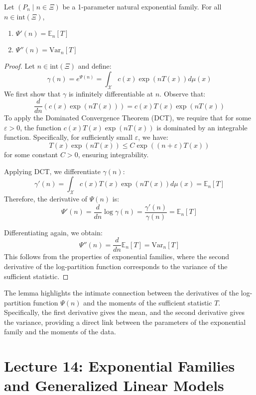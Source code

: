 \documentclass[open=any, 11pt,paper=A4]{scrreprt}
\begin{document}
\begin{lemma}
    Let \((P_n \mid n \in \Xi)\) be a 1-parameter natural exponential family. For all \(n \in \text{int}(\Xi)\),
    \begin{enumerate}
        \item \(\Psi'(n) = \mathbb{E}_n[T]\)
        \item \(\Psi''(n) = \text{Var}_n[T]\)
    \end{enumerate}
\end{lemma}

\begin{proof}
    Let \(n \in \text{int}(\Xi)\) and define:
    \[
    \gamma(n) = e^{\Psi(n)} = \int_{\mathcal{X}} c(x) \exp(n T(x)) d\mu(x)
    \]
    We first show that \(\gamma\) is infinitely differentiable at \(n\). Observe that:
    \[
    \frac{d}{dn} \left( c(x) \exp(n T(x)) \right) = c(x) T(x) \exp(n T(x))
    \]
    To apply the Dominated Convergence Theorem (DCT), we require that for some \(\varepsilon > 0\), the function \(c(x) T(x) \exp(n T(x))\) is dominated by an integrable function. Specifically, for sufficiently small \(\varepsilon\), we have:
    \[
    T(x) \exp(n T(x)) \leq C \exp((n + \varepsilon) T(x))
    \]
    for some constant \(C > 0\), ensuring integrability.

    Applying DCT, we differentiate \(\gamma(n)\):
    \[
    \gamma'(n) = \int_{\mathcal{X}} c(x) T(x) \exp(n T(x)) d\mu(x) = \mathbb{E}_n[T]
    \]
    Therefore, the derivative of \(\Psi(n)\) is:
    \[
    \Psi'(n) = \frac{d}{dn} \log \gamma(n) = \frac{\gamma'(n)}{\gamma(n)} = \mathbb{E}_n[T]
    \]

    Differentiating again, we obtain:
    \[
    \Psi''(n) = \frac{d}{dn} \mathbb{E}_n[T] = \text{Var}_n[T]
    \]
    This follows from the properties of exponential families, where the second derivative of the log-partition function corresponds to the variance of the sufficient statistic.
\end{proof}

\begin{remark}
    The lemma highlights the intimate connection between the derivatives of the log-partition function \(\Psi(n)\) and the moments of the sufficient statistic \(T\). Specifically, the first derivative gives the mean, and the second derivative gives the variance, providing a direct link between the parameters of the exponential family and the moments of the data.
\end{remark}

\chapter{Lecture 14: Exponential Families and Generalized Linear Models}
\end{document}
